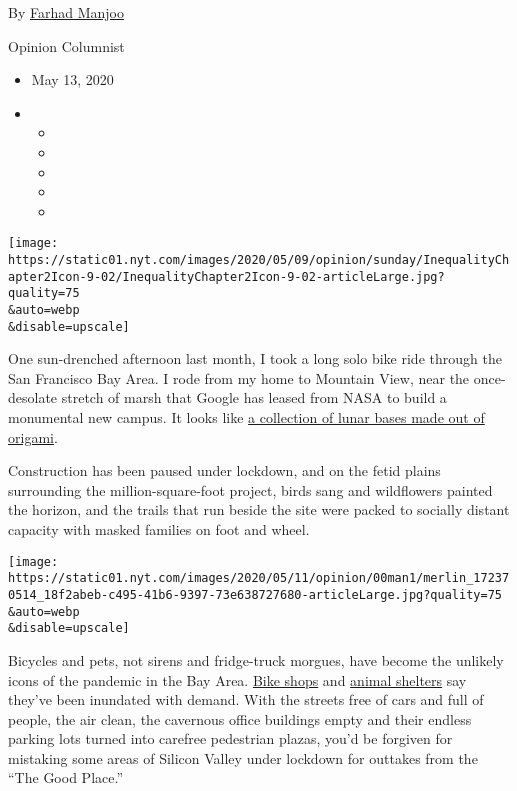 By \href{https://www.nytimes.com/by/farhad-manjoo}{Farhad Manjoo}

Opinion Columnist

\begin{itemize}
\item
  May 13, 2020
\item
  \begin{itemize}
  \item
  \item
  \item
  \item
  \item
  \end{itemize}
\end{itemize}

\texttt{[image: https://static01.nyt.com/images/2020/05/09/opinion/sunday/InequalityChapter2Icon-9-02/InequalityChapter2Icon-9-02-articleLarge.jpg?quality=75\\\&auto=webp\\\&disable=upscale]}

One sun-drenched afternoon last month, I took a long solo bike ride
through the San Francisco Bay Area. I rode from my home to Mountain
View, near the once-desolate stretch of marsh that Google has leased
from NASA to build a monumental new campus. It looks like
\href{https://www.dezeen.com/2019/08/27/google-hq-big-heatherwick-the-111th/}{a
collection of lunar bases made out of origami}.

Construction has been paused under lockdown, and on the fetid plains
surrounding the million-square-foot project, birds sang and wildflowers
painted the horizon, and the trails that run beside the site were packed
to socially distant capacity with masked families on foot and wheel.

\texttt{[image: https://static01.nyt.com/images/2020/05/11/opinion/00man1/merlin\_172370514\_18f2abeb-c495-41b6-9397-73e638727680-articleLarge.jpg?quality=75\\\&auto=webp\\\&disable=upscale]}

Bicycles and pets, not sirens and fridge-truck morgues, have become the
unlikely icons of the pandemic in the Bay Area.
\href{https://www.sfexaminer.com/the-city/san-francisco-bike-shops-are-booming-during-the-pandemic/}{Bike
shops} and
\href{https://sfpublicpress.org/news/2020-04/want-to-foster-a-dog-get-on-the-waitlist-as-demand-soars-at-bay-area-shelters}{animal
shelters} say they've been inundated with demand. With the streets free
of cars and full of people, the air clean, the cavernous office
buildings empty and their endless parking lots turned into carefree
pedestrian plazas, you'd be forgiven for mistaking some areas of Silicon
Valley under lockdown for outtakes from the ``The Good Place.''


